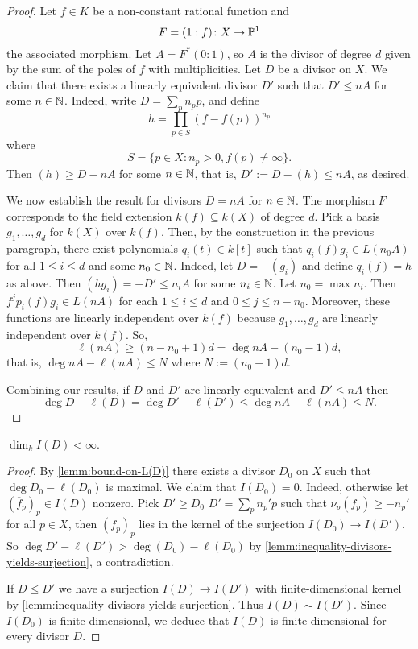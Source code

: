 \begin{proof}
	Let $f \in K$ be a non-constant rational function and 
	\[
		F = (1 : f)\colon X \to \P^{1}
	\]
	the associated morphism. Let $A = F^{*}(0 : 1)$, so $A$ is the divisor of degree $d$ given by the sum of the poles of $f$ with multiplicities. Let $D$ be a divisor on $X$. We claim that there exists a linearly equivalent divisor $D'$ such that $D' \leq nA$ for some $n \in \N$. Indeed, write $D = \sum_{p}n_{p}p$, and define 
	\[
		h = \prod_{p\in S}(f - f(p))^{n_{p}}
	\]
	where
	\[
		S = \{p \in X\colon n_{p} > 0, f(p)\neq \infty\}.
	\]
	Then $(h) \geq D - nA$ for some $n \in \N$, that is, $D' := D - (h) \leq nA$, as desired. 

	We now establish the result for divisors $D = nA$ for $n\in \N$. The morphism $F$ corresponds to the field extension $k(f) \subseteq k(X)$ of degree $d$. Pick a basis $g_{1}, \ldots, g_{d}$ for $k(X)$ over $k(f)$. Then, by the construction in the previous paragraph, there exist polynomials $q_{i}(t) \in k[t]$ such that $q_{i}(f)g_{i} \in L(n_{0}A)$ for all $1 \leq i \leq d$ and some $n_{0}\in \N$. Indeed, let $D = -(g_{i})$ and define $q_{i}(f) = h$ as above. Then $(hg_{i}) = -D' \leq n_{i}A$ for some $n_{i}\in \N$. Let $n_{0} = \max{n_{i}}$. Then $f^{j}p_{i}(f)g_{i} \in L(nA)$ for each $1 \leq i \leq d$ and $0 \leq j \leq n - n_{0}$. Moreover, these functions are linearly independent over $k(f)$ because $g_{1},\ldots,g_{d}$ are linearly independent over $k(f)$. So,
	\[
		\ell(nA) \geq (n - n_{0} + 1)d = \deg nA - (n_{0} - 1)d,
	\]
	that is, $\deg nA - \ell(nA) \leq N$ where $N:= (n_{0} -1)d$. 

	Combining our results, if $D$ and $D'$ are linearly equivalent and $D' \leq nA$ then 
	\[
		\deg D - \ell(D) = \deg D' - \ell(D') \leq \deg nA - \ell(nA) \leq N. 		
	\]
\end{proof}
\begin{theorem}\label{thm:I(D)-is-finite-dimensional}
	$\dim_{k}I(D) < \infty$.
\end{theorem}
\begin{proof}
	By \cref{lemm:bound-on-L(D)} there exists a divisor $D_{0}$ on $X$ such that $\deg D_{0} - \ell(D_{0})$ is maximal. We claim that $I(D_{0}) = 0$. Indeed, otherwise let $(\overline{f}_{p})_{p}\in I(D)$ nonzero. Pick $D' \geq D_{0}$  $D '= \sum_{p}n_{p}' p$ such that $\nu_{p}(f_{p}) \geq -n_{p}'$ for all $p\in X$, then $(f_{p})_{p}$ lies in the kernel of the surjection $I(D_{0})\to I(D')$. So $\deg D' - \ell(D') > \deg(D_{0}) - \ell(D_{0})$ by \cref{lemm:inequality-divisors-yields-surjection}, a contradiction. 

	If $D\leq D'$ we have a surjection $I(D) \to I(D')$ with finite-dimensional kernel by \cref{lemm:inequality-divisors-yields-surjection}. Thus $I(D) \sim I(D')$. Since $I(D_{0})$ is finite dimensional, we deduce that $I(D)$ is finite dimensional for every divisor $D$.
\end{proof}
